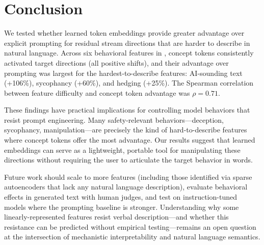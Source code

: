 \section{Conclusion}
\label{sec:conclusion}

We tested whether learned token embeddings provide greater advantage over explicit prompting for residual stream directions that are harder to describe in natural language. Across six behavioral features in \pythia, concept tokens consistently activated target directions (all positive shifts), and their advantage over prompting was largest for the hardest-to-describe features: AI-sounding text (+106\%), sycophancy (+60\%), and hedging (+25\%). The Spearman correlation between feature difficulty and concept token advantage was $\rho = 0.71$.

These findings have practical implications for controlling model behaviors that resist prompt engineering. Many safety-relevant behaviors---deception, sycophancy, manipulation---are precisely the kind of hard-to-describe features where concept tokens offer the most advantage. Our results suggest that learned embeddings can serve as a lightweight, portable tool for manipulating these directions without requiring the user to articulate the target behavior in words.

Future work should scale to more features (including those identified via sparse autoencoders that lack any natural language description), evaluate behavioral effects in generated text with human judges, and test on instruction-tuned models where the prompting baseline is stronger. Understanding why some linearly-represented features resist verbal description---and whether this resistance can be predicted without empirical testing---remains an open question at the intersection of mechanistic interpretability and natural language semantics.
